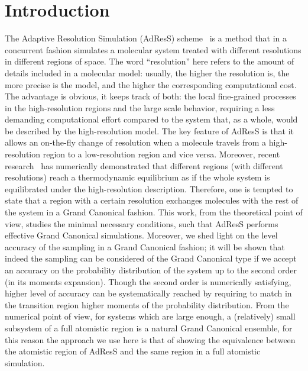 \documentclass[aip,jcp,a4paper,reprint,onecolumn]{revtex4-1}
\begin{document}
\section{Introduction}
The Adaptive Resolution Simulation (AdResS) scheme~\cite{jcp,pre} is a
method that in a concurrent fashion simulates a molecular system treated with different
resolutions in different regions of space.  The word ``resolution''
here refers to the amount of details included in a molecular model: usually, the higher the
resolution is, the more precise is the model, and the higher the corresponding computational cost.  The advantage is obvious, it
keeps track of both: the local fine-grained processes in the
high-resolution regions and the large scale behavior, requiring a less demanding computational effort compared to the system that, as a
whole, would be described by the high-resolution model. The key feature of
AdResS is that it allows an on-the-fly change of resolution when a
molecule travels from a high-resolution region to a low-resolution
region and vice versa. Moreover, recent research~\cite{prlgc, rdfcorr}
has numerically demonstrated that different regions (with different resolutions) reach a
thermodynamic equilibrium as if the whole system is equilibrated
under the high-resolution description. Therefore, one is tempted to state that a region with a
certain resolution exchanges molecules with the rest of the system in
a Grand Canonical fashion. This work, from the theoretical point of
view, studies the minimal necessary conditions, such that AdResS
performs effective Grand Canonical simulations.  
Moreover, we shed light on the level accuracy of
the sampling in a Grand Canonical fashion; it will be shown that indeed the sampling can be considered 
of the Grand Canonical type if we accept an accuracy on the probability distribution of the system up to the second order (in its moments expansion).
Though the second order is numerically satisfying, higher level of accuracy can be systematically reached by requiring to match in the transition region higher moments of the probability distribution.
From the numerical point of view, for systems which are large enough, a (relatively) small subsystem of a full atomistic region is a 
natural Grand Canonical ensemble, for this reason the approach we use here is that of showing the equivalence between the atomistic region of AdResS and the same region in a full atomistic simulation.
\end{document}
